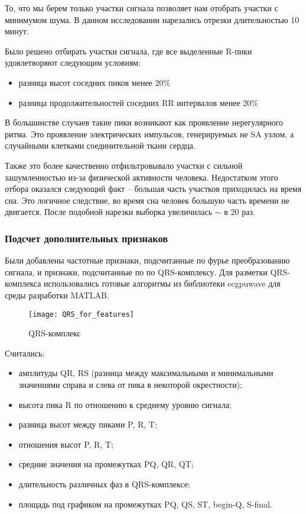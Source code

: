 То, что мы берем только участки сигнала позволяет нам отобрать участки с минимумом шума.
В данном исследовании нарезались отрезки длительностью 10 минут.

Было решено отбирать участки сигнала, где все выделенные R-пики удовлетворяют следующим условиям:

\begin{itemize}
	\item разница высот соседних пиков менее 20\%
	\item разница продолжительностей соседних RR интервалов менее 20\%
\end{itemize}

В большинстве случаев такие пики возникают как проявление нерегулярного ритма. Это проявление электрических импульсов, генерируемых не SA узлом, а случайными клетками соединительной ткани сердца. 

Также это более качественно отфильтровывало участки с сильной зашумленностью из-за физической активности человека. Недостатком этого отбора оказался следующий факт -- большая часть участков приходилась на время сна. Это логичное следствие, во время сна человек большую часть времени не двигается. После подобной нарезки выборка увеличилась $\sim$ в 20 раз.

\subsubsection{Подсчет дополнительных признаков}

Были добавлены частотные признаки, подсчитанные по фурье преобразованию сигнала, и признаки, подсчитанные по по QRS-комплексу. Для разметки QRS-комплекса использовались готовые алгоритмы из библиотеки ecgpuwave для среды разработки MATLAB.

\begin{figure}[h!]
	\begin{center}
		\texttt{[image: QRS\_for\_features]}
		\caption{QRS-комплекс}
		\label{ris:QRS}
	\end{center}
\end{figure}

Считались:

\begin{itemize}
	\item амплитуды QR, RS (разница между максимальными и минимальными значениями справа и слева от пика в некоторой окрестности);
	\item высота пика R по отношению к среднему уровню сигнала;
	\item разница высот между пиками P, R, T;
	\item отношения высот P, R, T;
	\item средние значения на промежутках PQ, QR, QT;
	\item длительность различных фаз в QRS-комплексе;
	\item площадь под графиком на промежутках PQ, QS, ST, begin-Q, S-final.
\end{itemize}


